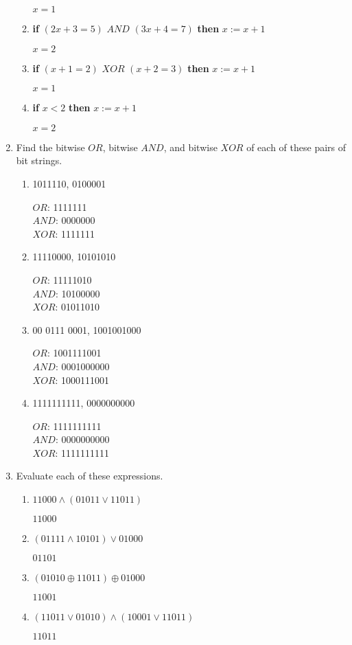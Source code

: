 \documentclass[11pt]{article}
\begin{document}
\begin{enumerate}[label=\textbf{\arabic*.}]
\begin{enumerate}[label=\textbf{\alph*)}]
		$ x = 1$
		
		\item \textbf{if} $(2x + 3 = 5)$ $AND$ $(3x + 4 = 7)$ \textbf{then} $x := x + 1$
		
		$x = 2$
		
		\item \textbf{if} $(x + 1 = 2)$ $XOR$ $(x + 2 = 3)$ \textbf{then} $x := x + 1$
		
		$x = 1$
		
		\item \textbf{if} $x < 2$ \textbf{then} $x := x + 1$
		
		$x = 2$
	\end{enumerate}

	\item Find the bitwise $OR$, bitwise $AND$, and bitwise $XOR$ of each of these pairs of bit strings.
	\begin{enumerate}[label=\textbf{\alph*)}]
		\item 1011110, 0100001
		
		$OR$: 1111111 \\
		$AND$: 0000000 \\
		$XOR$: 1111111
		
		\item 11110000, 10101010
		
		$OR$: 11111010 \\
		$AND$: 10100000 \\
		$XOR$: 01011010
		
		\item 00 0111 0001, 1001001000

		$OR$: 1001111001 \\
		$AND$: 0001000000 \\
		$XOR$: 1000111001
		
		\item 1111111111, 0000000000
		
		$OR$: 1111111111 \\
		$AND$: 0000000000 \\
		$XOR$: 1111111111
	\end{enumerate}

	\item Evaluate each of these expressions.
	\begin{enumerate}[label=\textbf{\alph*)}]
		\item $11000 \land (01011 \lor 11011)$
		
		$11000$
		
		\item $(01111 \land 10101) \lor 01000$
		
		$01101$
		
		\item $(01010 \oplus 11011) \oplus 01000$
		
		$11001$
		
		\item $(11011 \lor 01010) \land (10001 \lor 11011)$

		$11011$
	\end{enumerate}
\end{enumerate}
\end{document}
